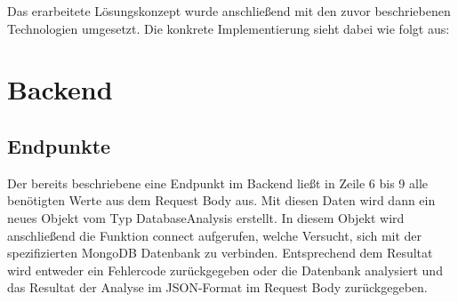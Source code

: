 Das erarbeitete Lösungskonzept wurde anschließend mit den zuvor beschriebenen Technologien umgesetzt.
Die konkrete Implementierung sieht dabei wie folgt aus:

\section{Backend}
\label{sec:backend}

\subsection{Endpunkte}
\label{sub:ba_endpunkte}

Der bereits beschriebene eine Endpunkt im Backend ließt in Zeile 6 bis 9 alle benötigten Werte aus dem Request Body aus.
Mit diesen Daten wird dann ein neues Objekt vom Typ DatabaseAnalysis erstellt.
In diesem Objekt wird anschließend die Funktion connect aufgerufen, welche Versucht, sich mit der spezifizierten MongoDB Datenbank zu verbinden.
Entsprechend dem Resultat wird entweder ein Fehlercode zurückgegeben oder die Datenbank analysiert und das Resultat der Analyse im JSON-Format im Request Body zurückgegeben.

